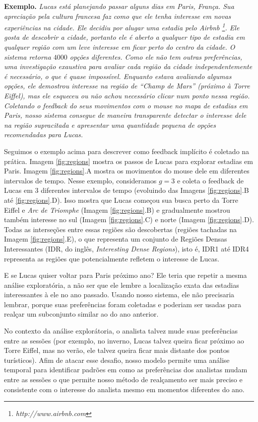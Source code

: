 {\bf Exemplo.} {\em Lucas está planejando passar alguns dias em Paris, França. Sua apreciação pela cultura francesa faz como que ele tenha interesse em novas experiências na cidade. Ele decidiu por alugar uma estadia pelo Airbnb \footnote{\it http://www.airbnb.com}. Ele gosta de descobrir a cidade, portanto ele é aberto a qualquer tipo de estadia em qualquer região com um leve interesse em ficar perto do centro da cidade. O sistema retorna $4000$ opções diferentes. Como ele não tem outras preferências, uma investigação exaustiva para avaliar cada região da cidade independentemente é necessário, o que é quase impossível. Enquanto estava avaliando algumas opções, ele demostrou interesse na região de  ``Champ de Mars'' (próximo à Torre Eiffel), mas ele esqueceu ou não achou necessário clicar num ponto nessa região. Coletando o feedback do seus movimentos com o mouse no mapa de estadias em Paris, nosso sistema consegue de maneira transparente detectar o interesse dele na região supracitada e apresentar uma quantidade pequena de opções recomendadas para Lucas.}

Seguimos o exemplo acima para descrever como feedback implícito é coletado na prática. Imagem \ref{fig:regions} mostra os passos de Lucas para explorar estadias em Paris. Imagem \ref{fig:regions}.A mostra os movimentos do mouse dele em diferentes intervalos de tempo. Nesse exemplo, consideramos $g = 3$ e coleta o feedback de Lucas em 3 diferentes intervalos de tempo (evoluindo das Imagens \ref{fig:regions}.B até \ref{fig:regions}.D). Isso mostra que Lucas começou sua busca perto da Torre Eiffel e {\em Arc de Triomphe} (Imagem \ref{fig:regions}.B) e gradualmente mostrou também interesse no sul (Imagem \ref{fig:regions}.C) e norte (Imagem \ref{fig:regions}.D). Todas as interseções entre essas regiões são descobertas (regiões tachadas na Imagem \ref{fig:regions}.E), o que representa um conjunto de Regiões Densas Interessantes (IDR, do inglês, {\em Interesting Dense Regions}), isto é, IDR1 até IDR4 representa as regiões que potencialmente refletem o interesse de Lucas.

E se Lucas quiser voltar para Paris próximo ano? Ele teria que repetir a mesma análise exploratória, a não ser que ele lembre a localização exata das estadias interessantes à ele no ano passado. Usando nosso sistema, ele não precisaria lembrar, porque suas preferências foram coletadas e poderiam ser usadas para realçar um subconjunto similar ao do ano anterior.

No contexto da análise explorátoria, o analista talvez mude suas preferências entre as sessões (por exemplo, no inverno, Lucas talvez queira ficar próximo ao Torre Eiffel, mas no verão, ele talvez queira ficar mais distante dos pontos turísticos). Afim de atacar esse desafio, nosso modelo permite uma análise temporal para identificar padrões em como as preferências dos analistas mudam entre as sessões o que permite nosso método de realçamento ser mais preciso e consistente com o interesse do analista mesmo em momentos diferentes do ano.

